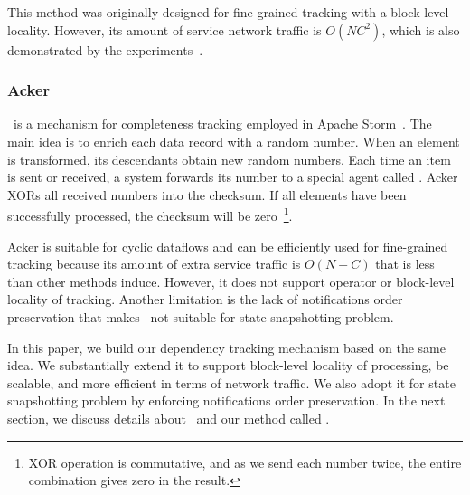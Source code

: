 This method was originally designed for fine-grained tracking with a block-level locality. However, its amount of service network traffic is $O(NC^2)$, which is also demonstrated by the experiments~\cite{Murray:2013:NTD:2517349.2522738}.



\subsubsection{Acker}

\acker\ is a mechanism for completeness tracking employed in Apache Storm~\cite{apache:storm}. The main idea is to enrich each data record with a random number. When an element is transformed, its descendants obtain new random numbers. Each time an item is sent or received, a system forwards its number to a special agent called {\em \acker}. Acker XORs all received numbers into the checksum. If all elements have been successfully processed, the checksum will be zero~\footnote{XOR operation is commutative, and as we send each number twice, the entire combination gives zero in the result.}.

Acker is suitable for cyclic dataflows and can be efficiently used for fine-grained tracking because its amount of extra service traffic is $O(N+C)$ that is less than other methods induce. However, it does not support operator or block-level locality of tracking. Another limitation is the lack of notifications order preservation that makes \acker\ not suitable for state snapshotting problem.

In this paper, we build our dependency tracking mechanism based on the same idea. We substantially extend it to support block-level locality of processing, be scalable, and more efficient in terms of network traffic. We also adopt it for state snapshotting problem by enforcing notifications order preservation. In the next section, we discuss details about \acker\ and our method called \tracker .